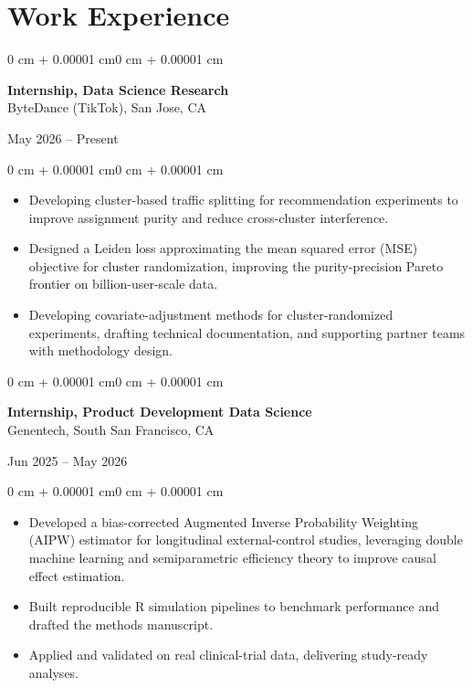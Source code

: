 \documentclass[10pt, letterpaper]{article}
\newenvironment{highlights}{
    \begin{itemize}[
        topsep=0.10 cm,
        parsep=0.10 cm,
        partopsep=0pt,
        itemsep=0pt,
        leftmargin=0 cm + 10pt
    ]
}{\end{itemize}}
\newenvironment{onecolentry}{
    \begin{adjustwidth}{0 cm + 0.00001 cm}{0 cm + 0.00001 cm}
}{\end{adjustwidth}}
\newenvironment{twocolentry}[2][]{
    \onecolentry
    \def\secondColumn{#2}
    \noindent\begin{minipage}[t]{\dimexpr\linewidth-4.7cm\relax}
}{
    \end{minipage}\hfill
    \begin{minipage}[t]{4.5cm}
        \raggedleft \secondColumn
    \end{minipage}
    \endonecolentry
}
\begin{document}
\section{Work Experience}

\begin{twocolentry}{May 2026 -- Present}
\textbf{Internship, Data Science Research}\\
ByteDance (TikTok), San Jose, CA
\end{twocolentry}

\vspace{0.1cm}
\begin{onecolentry}
    \begin{highlights}
        \item Developing cluster-based traffic splitting for recommendation experiments to improve assignment purity and reduce cross-cluster interference.
        \item Designed a Leiden loss approximating the mean squared error (MSE) objective for cluster randomization, improving the purity-precision Pareto frontier on billion-user-scale data.
        \item Developing covariate-adjustment methods for cluster-randomized experiments, drafting technical documentation, and supporting partner teams with methodology design.
    \end{highlights}
\end{onecolentry}

\vspace{0.20 cm}

\begin{twocolentry}{Jun 2025 -- May 2026}
\textbf{Internship, Product Development Data Science}\\
Genentech, South San Francisco, CA
\end{twocolentry}
    
\vspace{0.1cm}
\begin{onecolentry}
    \begin{highlights}
        \item Developed a bias-corrected Augmented Inverse Probability Weighting (AIPW) estimator for longitudinal external-control studies, leveraging double machine learning and semiparametric efficiency theory to improve causal effect estimation.
        \item Built reproducible R simulation pipelines to benchmark performance and drafted the  methods manuscript.
        \item Applied and validated on real clinical-trial data, delivering study-ready analyses.
    \end{highlights}
\end{onecolentry}
\end{document}
